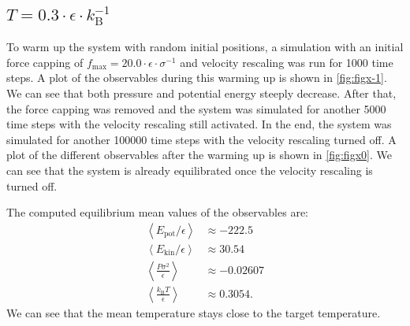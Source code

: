 \documentclass[a4paper,10pt,bibtotoc]{scrartcl}
\begin{document}
\subsection{$T = 0.3\cdot \epsilon\cdot k_\mathrm{B}^{-1}$}
To warm up the system with random initial positions, a simulation with an initial force capping of $f_\mathrm{max} = 20.0\cdot\epsilon\cdot \sigma^{-1}$ and velocity rescaling was run for 1000 time steps.
A plot of the observables during this warming up is shown in \autoref{fig:figx-1}.
We can see that both pressure and potential energy steeply decrease.
After that, the force capping was removed and the system was simulated for another 5000 time steps with the velocity rescaling still activated. 
In the end, the system was simulated for another 100000 time steps with the velocity rescaling turned off.
A plot of the different observables after the warming up is shown in \autoref{fig:figx0}.
We can see that the system is already equilibrated once the velocity rescaling is turned off. 

The computed equilibrium mean values of the observables are:
\begin{align*}
\left\langle E_\mathrm{pot}/\epsilon \right\rangle &\approx-222.5\\
\left\langle E_\mathrm{kin}/\epsilon\right\rangle &\approx 30.54\\
\left\langle \frac{P\sigma ^2}{\epsilon}\right\rangle &\approx-0.02607\\
\left\langle \frac{k_\mathrm{B}T}{\epsilon}\right\rangle &\approx0.3054.
\end{align*}
We can see that the mean temperature stays close to the target temperature.
\end{document}
